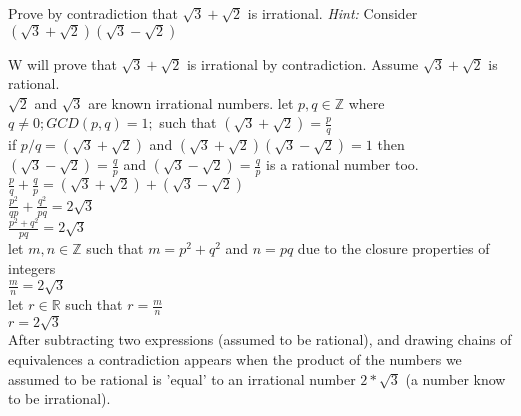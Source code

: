 \documentclass[solution,letterpaper]{cs20}
\begin{document}
    \begin{problem}
        \bigskip
        Prove by contradiction that $\sqrt{3} + \sqrt{2}$ is irrational. \emph{Hint:} Consider $(\sqrt{3} + \sqrt{2})(\sqrt{3} - \sqrt{2})$

        \begin{solution}
            W will prove that $\sqrt{3} + \sqrt{2}$ is irrational by contradiction. Assume $\sqrt{3} + \sqrt{2}$ is rational. \\

            $\sqrt{2}$ and $\sqrt{3}$ are known irrational numbers.
            let $p, q \in \mathbb{Z}$ where $q \neq 0; GCD(p, q) = 1; $ such that $(\sqrt{3} + \sqrt{2}) = \frac{p}{q}$ \\
            if $p/q = (\sqrt{3} + \sqrt{2})$ and $(\sqrt{3} + \sqrt{2})(\sqrt{3} - \sqrt{2}) = 1$ then $(\sqrt{3} - \sqrt{2}) = \frac{q}{p}$ and $(\sqrt{3} - \sqrt{2}) = \frac{q}{p}$ is a rational number too. \\

            $\frac{p}{q} + \frac{q}{p} = (\sqrt{3} + \sqrt{2}) + (\sqrt{3} - \sqrt{2}) $ \\
            $\frac{p^2}{qp} + \frac{q^2}{pq} = 2\sqrt{3}$ \\
            $\frac{p^2 + q^2}{pq} = 2\sqrt{3}$ \\
            let $m, n \in \mathbb{Z}$ such that $m = p^2 + q^2$ and $n = pq$ due to the closure properties of integers \\
            $\frac{m}{n} = 2\sqrt{3}$ \\
            let $r \in \mathbb{R}$ such that $r = \frac{m}{n}$\\
            $r = 2\sqrt{3}$ \\

            After subtracting two expressions (assumed to be rational), and drawing chains of equivalences a contradiction appears when the product of the numbers we assumed to be rational is 'equal' to an irrational number $2 * \sqrt{3}$ (a number know to be irrational).
        \end{solution}
    \end{problem}
    \newpage
\end{document}
